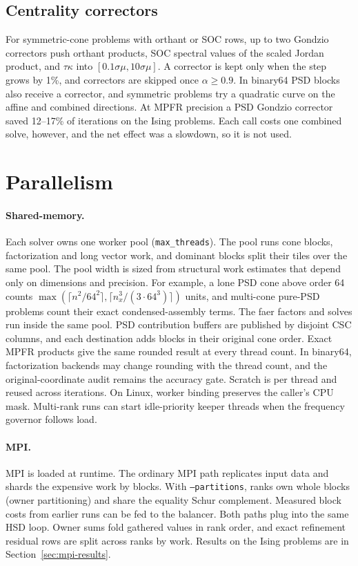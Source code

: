 \documentclass[11pt]{article}
\newcommand{\code}[1]{\texttt{#1}}
\begin{document}
\subsection{Centrality correctors}

For symmetric-cone problems with orthant or SOC rows, up to two Gondzio
correctors \cite{Gondzio1996} push orthant products, SOC spectral values of
the scaled Jordan product, and $\tau\kappa$ into $[0.1\sigma\mu, 10\sigma\mu]$.
A corrector is kept only when the step grows by 1\%, and correctors are
skipped once $\alpha\ge0.9$. In binary64 PSD blocks also receive a corrector,
and symmetric problems try a quadratic curve on the affine and combined
directions. At MPFR precision a PSD Gondzio corrector saved 12--17\% of
iterations on the Ising problems. Each call costs one combined solve,
however, and the net effect was a slowdown, so it is not used.

\section{Parallelism}
\label{sec:parallel}

\paragraph{Shared-memory.}
Each solver owns one worker pool (\code{max\_threads}). The pool runs cone
blocks, factorization and long vector work, and dominant blocks split their
tiles over the same pool. The pool width is sized from structural work
estimates that depend only on dimensions and precision. For example, a lone
PSD cone above order 64 counts
$\max(\lceil n^2/64^2\rceil, \lceil n_x^3/(3\cdot 64^3)\rceil)$ units, and
multi-cone pure-PSD problems count their exact condensed-assembly terms. The
faer factors and solves run inside the same pool. PSD contribution buffers
are published by disjoint CSC columns, and each destination adds blocks in
their original cone order. Exact MPFR products give the same rounded result
at every thread count. In binary64, factorization backends may change
rounding with the thread count, and the original-coordinate audit remains the
accuracy gate. Scratch is per thread and reused across iterations. On Linux,
worker binding preserves the caller's CPU mask. Multi-rank runs can start
idle-priority keeper threads when the frequency governor follows load.

\paragraph{MPI.}
MPI is loaded at runtime. The ordinary MPI path replicates input data and
shards the expensive work by blocks. With \code{--partitions}, ranks own whole
blocks (owner partitioning) and share the equality Schur complement. Measured
block costs from earlier runs can be fed to the balancer. Both paths plug into
the same HSD loop. Owner sums fold gathered values in rank order, and exact
refinement residual rows are split across ranks by work. Results on the Ising
problems are in Section~\ref{sec:mpi-results}.
\end{document}
